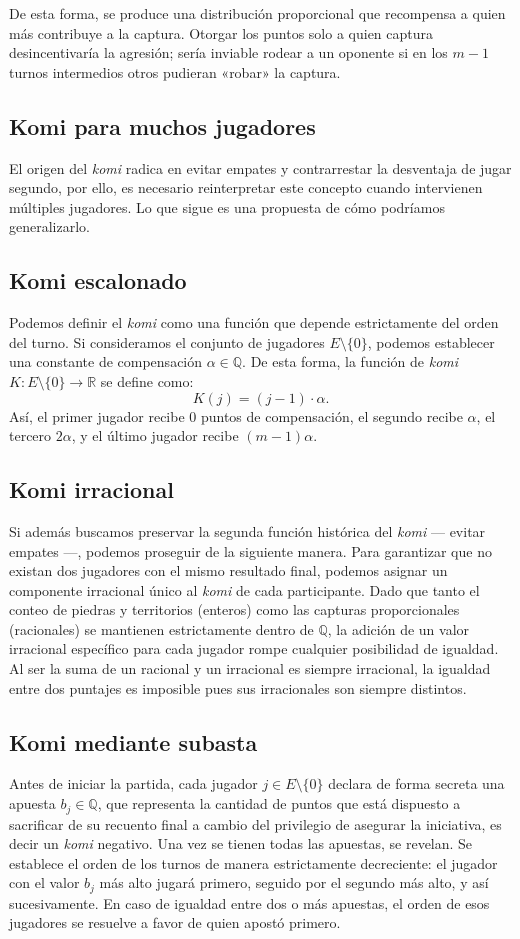 De esta forma, se produce una distribución proporcional que recompensa a quien más contribuye a la captura. Otorgar los puntos solo a quien captura desincentivaría la agresión; sería inviable rodear a un oponente si en los $m-1$ turnos intermedios otros pudieran «robar» la captura.

\subsection{Komi para muchos jugadores}\label{komi_n_jug}

El origen del \textit{komi} radica en evitar empates y contrarrestar la desventaja de jugar segundo, por ello, es necesario reinterpretar este concepto cuando intervienen múltiples jugadores. Lo que sigue es una propuesta de cómo podríamos generalizarlo.
\subsection*{Komi escalonado}
Podemos definir el \textit{komi} como una función que depende estrictamente del orden del turno. Si consideramos el conjunto de jugadores $E \setminus \{0\}$, podemos establecer una constante de compensación $\alpha \in \mathbb{Q}$.  De esta forma, la función de \textit{komi} $K: E \setminus \{0\} \to \mathbb{R}$ se define como:
\[K(j) = (j - 1) \cdot \alpha.\]
Así, el primer jugador recibe $0$ puntos de compensación, el segundo recibe $\alpha$, el tercero $2\alpha$, y el último jugador recibe $(m-1)\alpha$.
\subsection*{Komi irracional}
Si además buscamos preservar la segunda función histórica del \textit{komi} — evitar empates —, podemos proseguir de la siguiente manera. Para garantizar que no existan dos jugadores con el mismo resultado final, podemos asignar un componente irracional único al \textit{komi} de cada participante. Dado que tanto el conteo de piedras y territorios (enteros) como las capturas proporcionales (racionales) se mantienen estrictamente dentro de $\mathbb{Q}$, la adición de un valor irracional específico para cada jugador rompe cualquier posibilidad de igualdad. Al ser la suma de un racional y un irracional es siempre irracional, la igualdad entre dos puntajes es imposible pues sus irracionales son siempre distintos.

\subsection*{Komi mediante subasta}
Antes de iniciar la partida, cada jugador $j \in E \setminus \{0\}$ declara de forma secreta una apuesta $b_j \in \mathbb{Q}$, que representa la cantidad de puntos que está dispuesto a sacrificar de su recuento final a cambio del privilegio de asegurar la iniciativa, es decir un \textit{komi} negativo. Una vez se tienen todas las apuestas, se revelan. Se establece el orden de los turnos de manera estrictamente decreciente: el jugador con el valor $b_j$ más alto jugará primero, seguido por el segundo más alto, y así sucesivamente. En caso de igualdad entre dos o más apuestas, el orden de esos jugadores se resuelve a favor de quien apostó primero.

